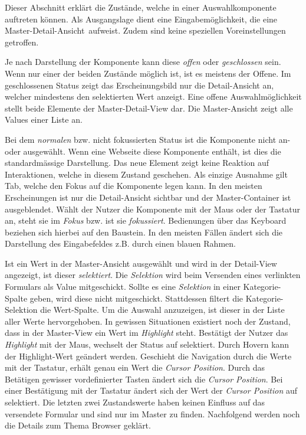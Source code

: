 Dieser Abschnitt erklärt die Zustände, welche in einer Auswahlkomponente auftreten können.
Als Ausgangslage dient eine Eingabemöglichkeit, die eine Master-Detail-Ansicht\footnotemark \ aufweist.
Zudem sind keine speziellen Voreinstellungen getroffen.

Je nach Darstellung der Komponente kann diese \emph{offen} oder \emph{geschlossen} sein.
Wenn nur einer der beiden Zustände möglich ist, ist es meistens der Offene.
Im geschlossenen Status zeigt das Erscheinungsbild nur die Detail-Ansicht an, welcher mindestens den selektierten Wert anzeigt.
Eine offene Auswahlmöglichkeit stellt beide Elemente der Master-Detail-View dar.
Die Master-Ansicht zeigt alle Values einer Liste an.

Bei dem \emph{normalen} bzw. nicht fokussierten Status ist die Komponente nicht an- oder ausgewählt.
Wenn eine Webseite diese Komponente enthält, ist dies die standardmässige Darstellung.
Das neue Element zeigt keine Reaktion auf Interaktionen, welche in diesem Zustand geschehen. 
Als einzige Ausnahme gilt Tab, welche den Fokus auf die Komponente legen kann. 
In den meisten Erscheinungen ist nur die Detail-Ansicht sichtbar und der Master-Container ist ausgeblendet.
Wählt der Nutzer die Komponente mit der Maus oder der Tastatur an, steht sie im \emph{Fokus} bzw. ist sie \emph{fokussiert}.
Bedienungen über das Keyboard beziehen sich hierbei auf den Baustein.
In den meisten Fällen ändert sich die Darstellung des Eingabefeldes z.B. durch einen blauen Rahmen.

Ist ein Wert in der Master-Ansicht ausgewählt und wird in der Detail-View angezeigt, ist dieser \emph{selektiert}.
Die \emph{Selektion} wird beim Versenden eines verlinkten Formulars als Value mitgeschickt.
Sollte es eine \emph{Selektion} in einer Kategorie-Spalte geben, wird diese nicht mitgeschickt.
Stattdessen filtert die Kategorie-Selektion die Wert-Spalte.
Um die Auswahl anzuzeigen, ist dieser in der Liste aller Werte hervorgehoben.
In gewissen Situationen existiert noch der Zustand, dass in der Master-View ein Wert im \emph{Highlight} steht. 
Bestätigt der Nutzer das \emph{Highlight} mit der Maus, wechselt der Status auf selektiert.
Durch Hovern kann der Highlight-Wert geändert werden. 
Geschieht die Navigation durch die Werte mit der Tastatur, erhält genau ein Wert die \emph{Cursor Position}. 
Durch das Betätigen gewisser vordefinierter Tasten ändert sich die \emph{Cursor Position}.
Bei einer Bestätigung mit der Tastatur ändert sich der Wert der \emph{Cursor Position} auf selektiert.
Die letzten zwei Zustandswerte haben keinen Einfluss auf das versendete Formular und sind nur im Master zu finden.
Nachfolgend werden noch die Details zum Thema Browser geklärt.


